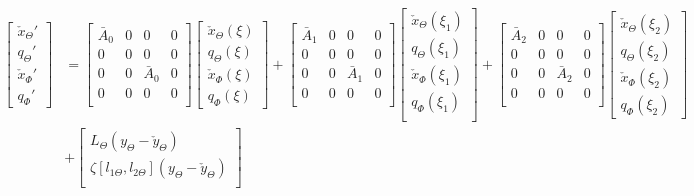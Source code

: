 \documentclass[main.tex]{subfiles}
\begin{document}
\begin{align}
\begin{bmatrix}
\check{x}_\Theta' \\
q_\Theta' \\
\check{x}_\Phi'\\
q_\Phi'
\end{bmatrix} &=
\begin{bmatrix}
\bar{A}_0 & 0 & 0 & 0\\
0 & 0 & 0 & 0\\
0 & 0 & \bar{A}_0 & 0 \\
0 & 0 & 0 & 0 \\
\end{bmatrix}
\begin{bmatrix}
\check{x}_\Theta(\xi) \\
q_\Theta(\xi) \\
\check{x}_\Phi(\xi) \\
q_\Phi (\xi)
\end{bmatrix} + 
\begin{bmatrix}
\bar{A}_1 & 0 & 0 & 0\\
0 & 0 & 0 & 0\\
0 & 0 & \bar{A}_1 & 0 \\
0 & 0 & 0 & 0 \\
\end{bmatrix}
\begin{bmatrix}
\check{x}_\Theta(\xi_1) \\
q_\Theta(\xi_1) \\
\check{x}_\Phi(\xi_1) \\
q_\Phi(\xi_1) \\
\end{bmatrix} +
\begin{bmatrix}
\bar{A}_2 & 0 & 0 & 0\\
0 & 0 & 0 & 0\\
0 & 0 & \bar{A}_2 & 0 \\
0 & 0 & 0 & 0 \\
\end{bmatrix}
\begin{bmatrix}
\check{x}_\Theta(\xi_2) \\
q_\Theta(\xi_2) \\
\check{x}_\Phi(\xi_2) \\
q_\Phi(\xi_2) 
\end{bmatrix} \nonumber\\
&+
\begin{bmatrix}
L_\Theta(y_{\Theta} - \check{y}_{\Theta})\\
\zeta[l_{1\Theta},l_{2\Theta}](y_\Theta - \check{y}_\Theta) \\

\end{bmatrix}
\end{align}
\end{document}
